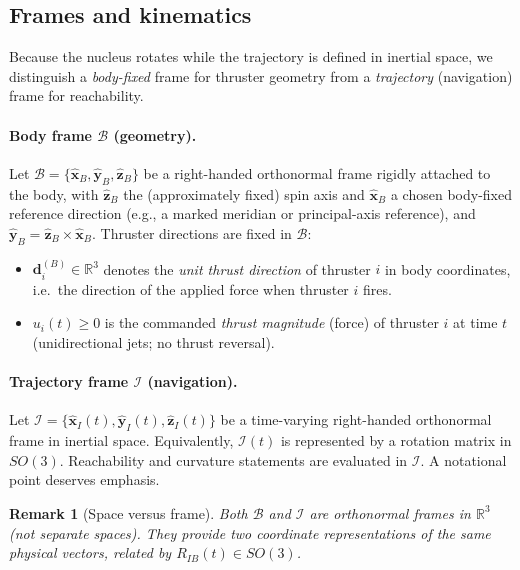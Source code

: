 \documentclass{article}
\newtheorem{remark}{Remark}
\begin{document}
\subsection{Frames and kinematics}
\label{sec:frames_kinematics}

Because the nucleus rotates while the trajectory is defined in inertial space, we distinguish
a \emph{body-fixed} frame for thruster geometry from a \emph{trajectory} (navigation) frame for reachability.


\paragraph{Body frame $\mathcal B$ (geometry).}
Let $\mathcal B=\{\hat{\mathbf x}_B,\hat{\mathbf y}_B,\hat{\mathbf z}_B\}$ be a right-handed orthonormal frame
rigidly attached to the body, with $\hat{\mathbf z}_B$ the (approximately fixed) spin axis and $\hat{\mathbf x}_B$
a chosen body-fixed reference direction (e.g., a marked meridian or principal-axis reference), and
$\hat{\mathbf y}_B=\hat{\mathbf z}_B\times \hat{\mathbf x}_B$.
Thruster directions are fixed in $\mathcal B$:
\begin{itemize}
\item $\mathbf d_i^{(B)}\in\mathbb R^3$ denotes the \emph{unit thrust direction} of thruster $i$ in body coordinates,
      i.e.\ the direction of the applied force when thruster $i$ fires.
\item $u_i(t)\ge 0$ is the commanded \emph{thrust magnitude} (force) of thruster $i$ at time $t$
      (unidirectional jets; no thrust reversal).
\end{itemize}

\paragraph{Trajectory frame $\mathcal I$ (navigation).}
Let $\mathcal I=\{\hat{\mathbf x}_I(t),\hat{\mathbf y}_I(t),\hat{\mathbf z}_I(t)\}$ be a time-varying
right-handed orthonormal frame in inertial space. Equivalently, $\mathcal I(t)$ is represented by a rotation
matrix in $SO(3)$. Reachability and curvature statements are evaluated in $\mathcal I$.
A notational point deserves emphasis.

\begin{remark}[Space versus frame]
Both $\mathcal B$ and $\mathcal I$ are orthonormal frames \emph{in} $\mathbb R^3$ (not separate spaces).
They provide two coordinate representations of the same physical vectors, related by $R_{IB}(t)\in SO(3)$.
\end{remark}
\end{document}
